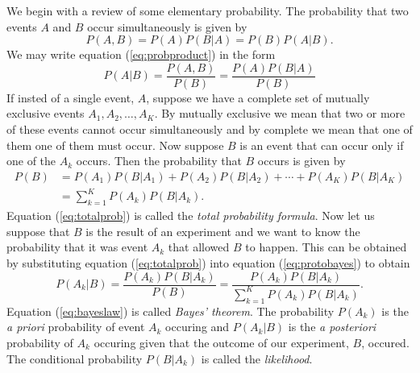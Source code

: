 We begin with a review of some elementary probability.  The probability that
two events $A$ and $B$ occur simultaneously is given by
\begin{equation}
P(A,B) = P(A) P(B|A) = P(B) P(A|B).
\label{eq:probproduct}
\end{equation}
We may write equation (\ref{eq:probproduct}) in the form
\begin{equation}
P(A|B) = \frac{P(A,B)}{P(B)} = \frac{P(A)P(B|A)}{P(B)}
\label{eq:protobayes}
\end{equation}
If insted of a single event, $A$, suppose we have a complete set of mutually
exclusive events $A_1, A_2, \ldots, A_K$. By mutually exclusive we mean that
two or more of these events cannot occur simultaneously and by complete we
mean that one of them one of them must occur. Now suppose $B$ is an event that
can occur only if one of the $A_k$ occurs. Then the probability that $B$
occurs is given by
\begin{equation}
\begin{split}
P(B) &= P(A_1)P(B|A_1) + P(A_2)P(B|A_2) + \cdots + P(A_K)P(B|A_K) \\
     &= \sum_{k=1}^K P(A_k)P(B|A_k).
\end{split}
\label{eq:totalprob}
\end{equation}
Equation (\ref{eq:totalprob}) is called the \emph{total probability formula}.
Now let us suppose that $B$ is the result of an experiment and we want to know
the probability that it was event $A_k$ that allowed $B$ to happen. This can
be obtained by substituting equation (\ref{eq:totalprob}) into equation
(\ref{eq:protobayes}) to obtain
\begin{equation}
P(A_k|B) = \frac{P(A_k)P(B|A_k)}{P(B)} 
= \frac{P(A_k)P(B|A_k)}{\sum_{k=1}^K P(A_k)P(B|A_k)}.
\label{eq:bayeslaw}
\end{equation}
Equation (\ref{eq:bayeslaw}) is called \emph{Bayes' theorem}. The probability
$P(A_k)$ is the \emph{a priori} probability of event $A_k$ occuring and
$P(A_k|B)$ is the \emph{a posteriori} probability of $A_k$ occuring given
that the outcome of our experiment, $B$, occured. The conditional probability
$P(B|A_k)$ is called the \emph{likelihood}.

